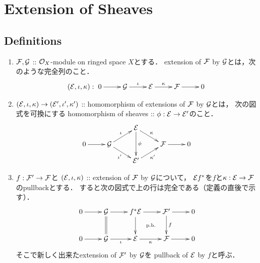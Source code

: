 \documentclass[a4paper]{jsarticle}
\makeatletter
\newcommand{\centerpb}{\ar@{}[lu]|{\text{p.b.}}}
\makeatother
\begin{document}
\section{Extension of Sheaves}
    \subsection{Definitions}
    \begin{Def}
        \begin{enumerate}[label=(\roman*), leftmargin=*]
        \item
            $\mathcal{F}, \mathcal{G}$ :: $\mathcal{O}_X$-module on ringed space $X$とする．
            extension of $\mathcal{F}$ by $\mathcal{G}$とは，次のような完全列のこと．
            \[
            (\shE, \iota, \kappa):
                \xymatrix{
                    0 \ar[r]& \shG \ar[r]^-{\iota}& \shE \ar[r]^-{\kappa}& \shF \ar[r]& 0
            }\]

        \item
            $(\mathcal{E}, \iota, \kappa) \to (\mathcal{E}', \iota', \kappa')$
            :: homomorphism of extensions of $\mathcal{F}$ by $\mathcal{G}$とは，
            次の図式を可換にする
            homomorphism of sheaves :: $\phi: \mathcal{E} \to \mathcal{E}'$のこと．
            \[\xymatrix@R=10pt{
                    {}& {}& \shE \ar[dd]^-{\phi} \ar[rd]^-{\kappa}& {}& {} \\
                    0 \ar[r]& \shG \ar[ru]^-{\iota}\ar[rd]_-{\iota'}& {} & \shF \ar[r]& 0 \\
                    {}& {}& \shE' \ar[ru]_-{\kappa'}& {}& {}
            }\]
        
        \item
            $f: \mathcal{F}' \to \mathcal{F}$と
            $(\mathcal{E}, \iota, \kappa)$ :: extension of $\mathcal{F}$ by $\mathcal{G}$について，
            $\mathcal{E} f^*$を$f$と$\kappa: \mathcal{E} \to \mathcal{F}$のpullbackとする．
            すると次の図式で上の行は完全である（定義の直後で示す）．
            \[\vcenter{\xymatrix{
                0 \ar[r]& \shG \ar@{=}[d]\ar[r]& f^*\shE \ar[d]\ar[r]& \shF' \ar[d]^-{f}\ar[r]& 0 \\
                0 \ar[r]& \shG \ar[r]_-{\iota}& \shE \ar[r]_-{\kappa}& \shF \ar[r]\centerpb& 0
            }}\]
            そこで新しく出来たextension of $\mathcal{F}'$ by $\mathcal{G}$を
            pullback of $\mathcal{E}$ by $f$と呼ぶ．


\end{enumerate}
\end{Def}
\end{document}
